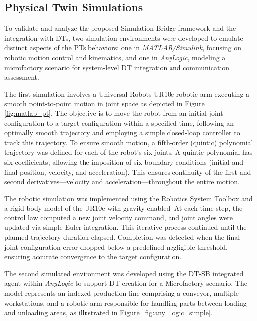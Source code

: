 
\subsection{Physical Twin Simulations}

To validate and analyze the proposed Simulation Bridge framework and the integration with DTs, two simulation environments were developed to emulate distinct aspects of the PTs behaviors: one in \textit{MATLAB/Simulink}, focusing on robotic motion control and kinematics, and one in \textit{AnyLogic}, modeling a microfactory scenario for system-level DT integration and communication assessment.

The first simulation involves a Universal Robots UR10e robotic arm executing a smooth point-to-point motion in joint space as depicted in Figure \ref{fig:matlab_pt}. The objective is to move the robot from an initial joint configuration to a target configuration within a specified time, following an optimally smooth trajectory and employing a simple closed-loop controller to track this trajectory. To ensure smooth motion, a fifth-order (quintic) polynomial trajectory was defined for each of the robot’s six joints. A quintic polynomial has six coefficients, allowing the imposition of six boundary conditions (initial and final position, velocity, and acceleration). This ensures continuity of the first and second derivatives—velocity and acceleration—throughout the entire motion.

The robotic simulation was implemented using the Robotics System Toolbox and a rigid-body model of the UR10e with gravity enabled. At each time step, the control law computed a new joint velocity command, and joint angles were updated via simple Euler integration. This iterative process continued until the planned trajectory duration elapsed. Completion was detected when the final joint configuration error dropped below a predefined negligible threshold, ensuring accurate convergence to the target configuration.

The second simulated environment was developed using the DT-SB integrated agent within \textit{AnyLogic} to support DT creation for a Microfactory scenario. The model represents an indexed production line comprising a conveyor, multiple workstations, and a robotic arm responsible for handling parts between loading and unloading areas, as illustrated in Figure~\ref{fig:any_logic_simple}. 

